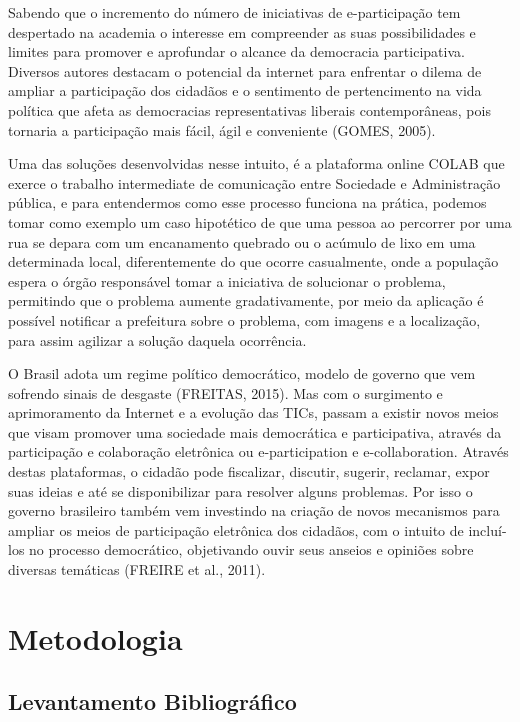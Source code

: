 \documentclass[12pt]{article}
\begin{document}
Sabendo que o incremento do número de iniciativas de e-participação tem despertado na academia o interesse em compreender as suas possibilidades e limites para promover e aprofundar o alcance da democracia participativa. Diversos autores destacam o potencial da internet para enfrentar o dilema de ampliar a participação dos cidadãos e o sentimento de pertencimento na vida política que afeta as democracias representativas liberais contemporâneas, pois tornaria a participação mais fácil, ágil e conveniente (GOMES, 2005).

Uma das soluções desenvolvidas nesse intuito, é a plataforma online COLAB que exerce o trabalho intermediate de comunicação entre Sociedade e Administração pública, e para entendermos como esse processo funciona na prática, podemos tomar como exemplo um caso hipotético de que uma pessoa ao percorrer por uma rua se depara com um encanamento quebrado ou o acúmulo de lixo em uma determinada local, diferentemente do que ocorre casualmente, onde a população espera o órgão responsável tomar a iniciativa de solucionar o problema, permitindo que o problema aumente gradativamente, por meio da aplicação é possível notificar a prefeitura sobre o problema, com imagens e a localização, para assim agilizar a solução daquela ocorrência.

O Brasil adota um regime político democrático, modelo de governo que vem sofrendo sinais de desgaste (FREITAS, 2015). Mas com o surgimento e aprimoramento da Internet e a evolução das TICs, passam a existir novos meios que visam promover uma sociedade mais democrática e participativa, através da participação e colaboração eletrônica ou e-participation e e-collaboration. Através destas plataformas, o cidadão pode fiscalizar, discutir, sugerir, reclamar, expor suas ideias e até se disponibilizar para resolver alguns problemas. Por isso o governo brasileiro também vem investindo na criação de novos mecanismos para ampliar os meios de participação eletrônica dos cidadãos, com o intuito de incluí-los no processo democrático, objetivando ouvir seus anseios e opiniões sobre diversas temáticas (FREIRE et al., 2011).

\section{Metodologia}

\subsection{Levantamento Bibliográfico}
\end{document}
